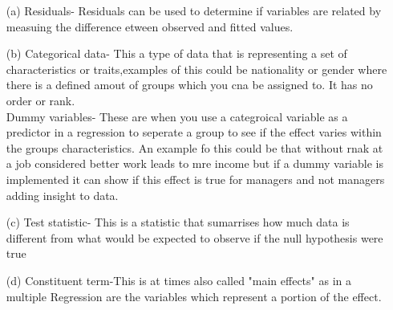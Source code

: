 \documentclass[12pt,letterpaper]{article}
\begin{document}
	 \newpage
	\begin{enumerate}
		
		\item [(a)]
		Residuals- Residuals can be used to determine if variables are related by measuing the difference etween observed and fitted values.
		
		\vspace{1cm}
		\item [(b)]
		Categorical data- This a type of data that is representing a set of characteristics or traits,examples of this could be nationality or gender where there is a defined  amout of groups which you cna be assigned to. It has no order or rank.\\

		Dummy variables- These are when you use a categroical variable as a predictor in a regression to seperate a group to see if the effect varies within the groups characteristics. An example fo this could be that without rnak at a job considered better work leads to mre income but if a dummy variable is implemented it can show if this effect is true for managers and not managers adding insight to data.
		
		\vspace{1cm}
		\item [(c)]
		Test statistic- This is a statistic that sumarrises how much data is different from what would be expected to observe if the null hypothesis were true 
		\vspace{1cm}
		\item [(d)]
		Constituent term-This is at times also called "main effects" as in a multiple Regression are the variables which represent a portion of the effect.

		
	\end{enumerate}
	
	\newpage
	
\end{document}
